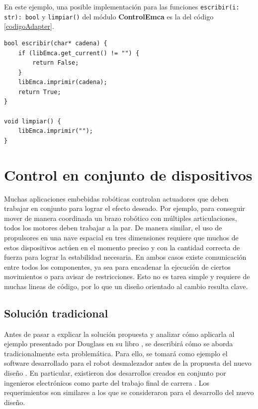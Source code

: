 En este ejemplo, una posible implementación para las funciones \verb|escribir(i: str): bool| y \verb|limpiar()| del módulo \textbf{ControlEmca} es la del código \ref{codigoAdapter}.

\begin{lstlisting}[label={codigoAdapter}, caption=Ejemplo implementación módulo ControlEmca.]
bool escribir(char* cadena) {
    if (libEmca.get_current() != "") {
        return False;
    }
    libEmca.imprimir(cadena);
    return True;
}

void limpiar() {
    libEmca.imprimir("");
}
\end{lstlisting}


\section{Control en conjunto de dispositivos}
Muchas aplicaciones embebidas robóticas controlan \gls{actuadores} que deben trabajar en conjunto para lograr el efecto deseado. Por ejemplo, para conseguir mover de manera coordinada un brazo robótico con múltiples articulaciones, todos los motores deben trabajar a la par. De manera similar, el uso de propulsores en una nave espacial en tres dimensiones requiere que muchos de estos dispositivos actúen en el momento preciso y con la cantidad correcta de fuerza para lograr la estabilidad necesaria. En ambos casos existe comunicación entre todos los componentes, ya sea para encadenar la ejecución de ciertos movimientos o para avisar de restricciones. Esto no es tarea simple y requiere de muchas lineas de código, por lo que un diseño orientado al cambio resulta clave.

\subsection*{Solución tradicional}

Antes de pasar a explicar la solución propuesta y analizar cómo aplicarla al ejemplo presentado por Douglass en su libro \cite{douglass}, se describirá cómo se aborda tradicionalmente esta problemática. Para ello, se tomará como ejemplo el software desarrollado para el robot desmalezador antes de la propuesta del nuevo diseño \cite{paperPomponio}. En particular, existieron dos desarrollos creados en conjunto por ingenieros electrónicos como parte del trabajo final de carrera \cite{disenioViejo1, disenioViejo2}. Los requerimientos son similares a los que se consideraron para el desarrollo del nuevo diseño.

